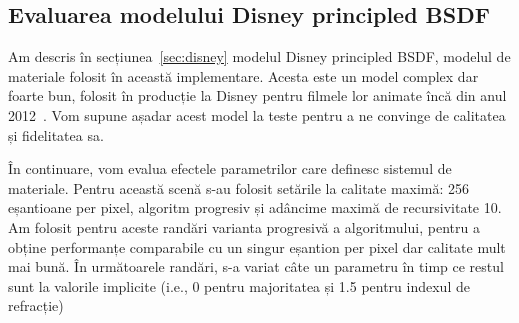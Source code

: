 \documentclass[12pt,a4paper]{report}
\numberwithin{equation}{section} %
\begin{document}
\subsection{Evaluarea modelului Disney principled BSDF}

Am descris în secțiunea~\ref{sec:disney} modelul Disney principled BSDF, modelul
de materiale folosit în această implementare. Acesta este un model complex dar foarte bun,
folosit în producție la Disney pentru filmele lor animate încă din anul 2012~\cite{Disney}.
Vom supune așadar acest model la teste pentru a ne convinge de calitatea și fidelitatea sa. 

În continuare, vom evalua efectele parametrilor care definesc sistemul de materiale. Pentru această
scenă s-au folosit setările la calitate maximă: 256 eșantioane per pixel, algoritm progresiv și adâncime
maximă de recursivitate 10. Am folosit pentru aceste randări varianta progresivă a algoritmului,
pentru a obține performanțe comparabile cu un singur eșantion per pixel dar calitate mult mai bună.
În următoarele randări, s-a variat câte un parametru
în timp ce restul sunt la valorile implicite (i.e., 0 pentru majoritatea și 1.5 pentru
indexul de refracție)
\end{document}
